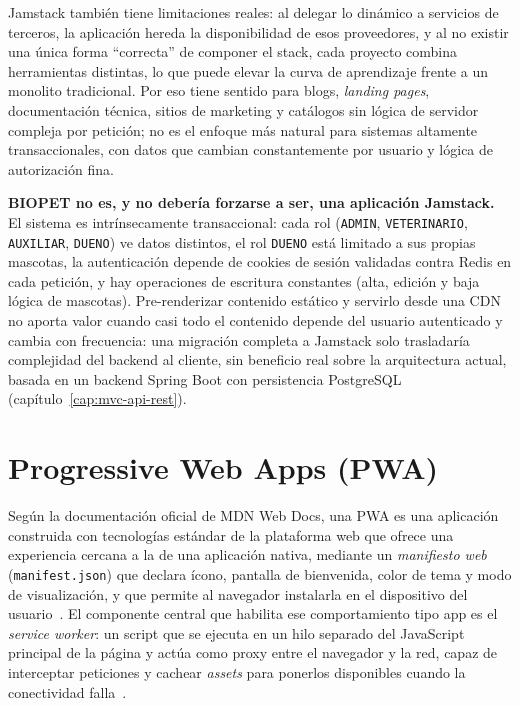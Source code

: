 Jamstack tambi\'en tiene limitaciones reales: al delegar lo din\'amico a
servicios de terceros, la aplicaci\'on hereda la disponibilidad de esos
proveedores, y al no existir una \'unica forma ``correcta'' de componer el
stack, cada proyecto combina herramientas distintas, lo que puede elevar la
curva de aprendizaje frente a un monolito tradicional. Por eso tiene sentido
para blogs, \emph{landing pages}, documentaci\'on t\'ecnica, sitios de
marketing y cat\'alogos sin l\'ogica de servidor compleja por petici\'on; no
es el enfoque m\'as natural para sistemas altamente transaccionales, con
datos que cambian constantemente por usuario y l\'ogica de autorizaci\'on
fina.

\textbf{BIOPET no es, y no deber\'ia forzarse a ser, una aplicaci\'on
Jamstack.} El sistema es intr\'insecamente transaccional: cada rol
(\texttt{ADMIN}, \texttt{VETERINARIO}, \texttt{AUXILIAR}, \texttt{DUENO}) ve
datos distintos, el rol \texttt{DUENO} est\'a limitado a sus propias
mascotas, la autenticaci\'on depende de cookies de sesi\'on validadas contra
Redis en cada petici\'on, y hay operaciones de escritura constantes (alta,
edici\'on y baja l\'ogica de mascotas). Pre-renderizar contenido est\'atico y
servirlo desde una CDN no aporta valor cuando casi todo el contenido depende
del usuario autenticado y cambia con frecuencia: una migraci\'on completa a
Jamstack solo trasladar\'ia complejidad del backend al cliente, sin
beneficio real sobre la arquitectura actual, basada en un backend Spring
Boot con persistencia PostgreSQL (cap\'itulo~\ref{cap:mvc-api-rest}).

\section{Progressive Web Apps (PWA)}
\label{sec:pwa}

Seg\'un la documentaci\'on oficial de MDN Web Docs, una PWA es una
aplicaci\'on construida con tecnolog\'ias est\'andar de la plataforma web que
ofrece una experiencia cercana a la de una aplicaci\'on nativa, mediante un
\emph{manifiesto web} (\texttt{manifest.json}) que declara \'icono, pantalla
de bienvenida, color de tema y modo de visualizaci\'on, y que permite al
navegador instalarla en el dispositivo del usuario~\parencite{mdn-pwa-guide}. El
componente central que habilita ese comportamiento tipo app es el
\emph{service worker}: un script que se ejecuta en un hilo separado del
JavaScript principal de la p\'agina y act\'ua como proxy entre el navegador y
la red, capaz de interceptar peticiones y cachear \emph{assets} para
ponerlos disponibles cuando la conectividad falla~\parencite{mdn-pwa-serviceworkers}.

